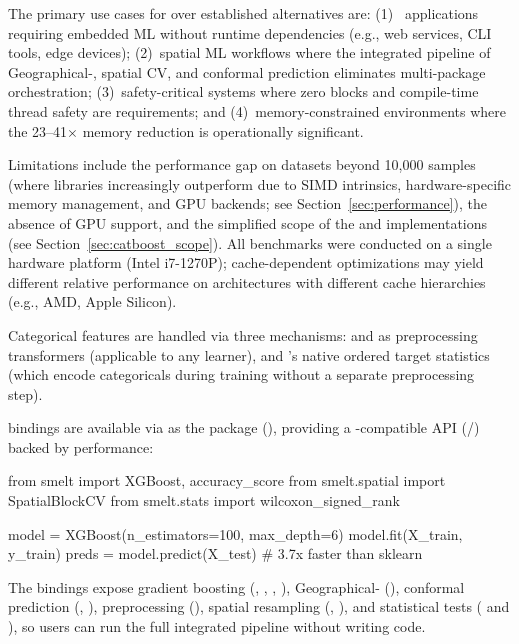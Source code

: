 \documentclass[article]{jss}
\begin{document}
The primary use cases for  over established 
alternatives are: (1)~ applications requiring embedded ML
without  runtime dependencies (e.g., web services, CLI tools,
edge devices); (2)~spatial ML workflows where the integrated pipeline of
Geographical-, spatial CV, and conformal prediction eliminates
multi-package orchestration; (3)~safety-critical systems where zero
 blocks and compile-time thread safety are requirements; and
(4)~memory-constrained environments where the 23--41$\times$ memory reduction
is operationally significant.

Limitations include the performance gap on datasets beyond 10{,}000 samples
(where  libraries increasingly outperform  due to
SIMD intrinsics, hardware-specific memory management, and GPU backends;
see Section~\ref{sec:performance}), the absence of GPU support, and the
simplified scope of the  and  implementations
(see Section~\ref{sec:catboost_scope}). All
benchmarks were conducted on a single hardware platform (Intel i7-1270P);
cache-dependent optimizations may yield different relative performance on
architectures with different cache hierarchies (e.g., AMD, Apple Silicon).

Categorical features are handled via three mechanisms:  and
 as preprocessing transformers (applicable to any learner),
and 's native ordered target statistics (which encode
categoricals during training without a separate preprocessing step).

 bindings are available via  as the 
package (), providing a -compatible
API (/) backed by  performance:

\begin{CodeChunk}
\begin{CodeInput}
from smelt import XGBoost, accuracy_score
from smelt.spatial import SpatialBlockCV
from smelt.stats import wilcoxon_signed_rank

model = XGBoost(n_estimators=100, max_depth=6)
model.fit(X_train, y_train)
preds = model.predict(X_test)  # 3.7x faster than sklearn
\end{CodeInput}
\end{CodeChunk}

{\sloppy
The bindings expose gradient boosting (, ,
, ), Geographical-
(), conformal prediction (,
), preprocessing (), spatial
resampling (, ), and statistical
tests ( and ), so
 users can run the full integrated pipeline without writing
 code.\par}
\end{document}
